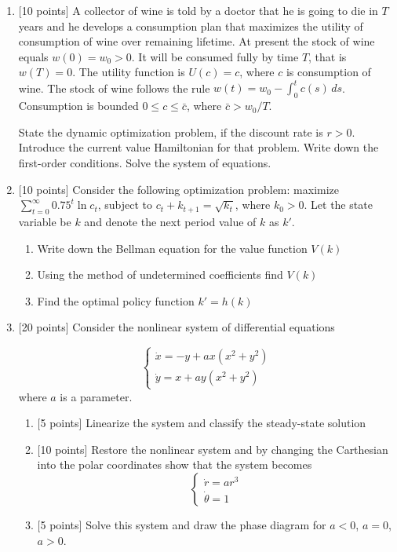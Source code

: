 \documentclass[pdftex,12pt,a4paper]{article}
\begin{document}
\begin{enumerate}
\item $[$10 points] A collector of wine is told by a doctor that he is going to die in $T$ years and he develops a consumption plan that maximizes the utility of consumption of wine over remaining lifetime. At present the stock of wine equals $w(0)=w_0>0$. It will be consumed fully by time $T$, that is $w(T)=0$. The utility function is $U(c)=c$, where $c$ is consumption of wine. The stock of wine follows the rule $w(t)=w_0-\int_0^t c(s) \, ds$. Consumption is bounded $0\leq c \leq \bar{c}$, where $\bar{c}>w_0/T$.

State the dynamic optimization problem, if the discount rate is $r>0$. Introduce the current value Hamiltonian for that problem. Write down the first-order conditions. Solve the system of equations.

\item $[$10 points] Consider the following optimization problem: maximize $\sum_{t=0}^{\infty} 0.75^t \ln c_t$, subject to $c_t+k_{t+1}=\sqrt{k_t}$, where $k_0>0$. Let the state variable be $k$ and denote the next period value of $k$ as $k'$.

\begin{enumerate}
\item Write down the Bellman equation for the value function $V(k)$
\item Using the method of undetermined coefficients find $V(k)$
\item Find the optimal policy function $k'=h(k)$
\end{enumerate}

\item $[$20 points] Consider the nonlinear system of differential equations

\[
\begin{cases}
\dot{x}=-y+ax(x^2+y^2) \\
\dot{y}=x+ay(x^2+y^2)
\end{cases}
\]
where $a$ is a parameter.

\begin{enumerate}
\item $[$5 points] Linearize the system and classify the steady-state solution
\item $[$10 points] Restore the nonlinear system and by changing the Carthesian  into the polar coordinates show that the system becomes
\[
\begin{cases}
\dot{r}=ar^3 \\
\dot{\theta}=1
\end{cases}
\]

\item $[$5 points] Solve this system and draw the phase diagram for $a<0$, $a=0$, $a>0$.
\end{enumerate}


\end{enumerate}
\end{document}
